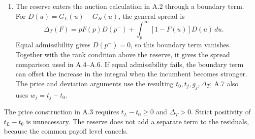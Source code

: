 \begin{enumerate}
\item
The reserve enters the auction calculation in A.2 through a boundary term.
For \(D(u)=G_L(u)-G_H(u)\), the general spread is
\[
\Delta_T(F)=pF(p)D(p^-)+\int_p^\infty[1-F(u)]D(u)\,du.
\]
Equal admissibility gives \(D(p^-)=0\), so this boundary term vanishes.
Together with the rank condition above the reserve, it gives the spread comparison used in A.4--A.6.
If equal admissibility fails, the boundary term can offset the increase in the integral when the incumbent becomes stronger.
The price and deviation arguments use the resulting \(t_0,t_j,g_j,\Delta_T\);
A.7 also uses \(w_j=t_j-t_0\).
\end{enumerate}

The price construction in A.3 requires \(t_L-t_0\ge0\) and \(\Delta_T>0\).
Strict positivity of \(t_L-t_0\) is unnecessary.
The reserve does not add a separate term to the residuals, because the common payoff level cancels.
